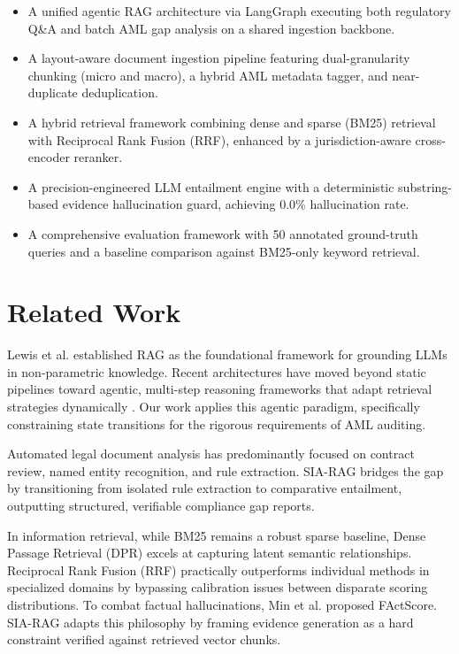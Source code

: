 \documentclass[conference, a4paper]{IEEEtran}
\begin{document}
\begin{itemize}
    \item A unified agentic RAG architecture via LangGraph executing both regulatory Q\&A and
    batch AML gap analysis on a shared ingestion backbone.
    \item A layout-aware document ingestion pipeline featuring dual-granularity chunking (micro
    and macro), a hybrid AML metadata tagger, and near-duplicate deduplication.
    \item A hybrid retrieval framework combining dense and sparse (BM25) retrieval with Reciprocal
    Rank Fusion (RRF), enhanced by a jurisdiction-aware cross-encoder reranker.
    \item A precision-engineered LLM entailment engine with a deterministic substring-based
    evidence hallucination guard, achieving 0.0\% hallucination rate.
    \item A comprehensive evaluation framework with 50 annotated ground-truth queries and a
    baseline comparison against BM25-only keyword retrieval.
\end{itemize}

\section{Related Work}

Lewis et al. \cite{c1} established RAG as the foundational framework for grounding LLMs in
non-parametric knowledge. Recent architectures have moved beyond static pipelines toward agentic,
multi-step reasoning frameworks that adapt retrieval strategies dynamically \cite{c6}. Our work
applies this agentic paradigm, specifically constraining state transitions for the rigorous
requirements of AML auditing.

Automated legal document analysis has predominantly focused on contract review, named entity
recognition, and rule extraction. SIA-RAG bridges the gap by transitioning from isolated rule
extraction to comparative entailment, outputting structured, verifiable compliance gap reports.

In information retrieval, while BM25 \cite{c2} remains a robust sparse baseline, Dense Passage
Retrieval (DPR) \cite{c3} excels at capturing latent semantic relationships. Reciprocal Rank
Fusion (RRF) \cite{c7} practically outperforms individual methods in specialized domains by
bypassing calibration issues between disparate scoring distributions. To combat factual
hallucinations, Min et al. \cite{c5} proposed FActScore. SIA-RAG adapts this philosophy by
framing evidence generation as a hard constraint verified against retrieved vector chunks.
\end{document}
